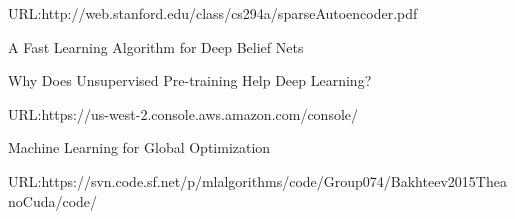 \documentclass[12pt,twoside]{article}
\begin{document}
\begin{thebibliography}{1}
URL:http://web.stanford.edu/class/cs294a/sparseAutoencoder.pdf


A Fast Learning Algorithm for Deep Belief Nets



Why Does Unsupervised Pre-training Help Deep Learning?

URL:https://us-west-2.console.aws.amazon.com/console/

Machine Learning for Global Optimization

URL:https://svn.code.sf.net/p/mlalgorithms/code/Group074/Bakhteev2015TheanoCuda/code/
\end{thebibliography}
\end{document}
